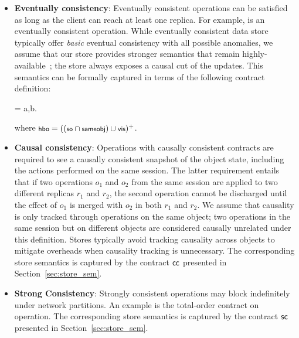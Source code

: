 \begin{itemize}
\setlength{\itemsep}{2pt}

\item \textbf{Eventually consistency}: Eventually consistent operations can be
satisfied as long as the client can reach at least one replica. For example,
 is an eventually consistent operation. While eventually consistent data
store typically offer \emph{basic} eventual consistency with all possible
anomalies, we assume that our store provides stronger semantics that remain
highly-available~\cite{BailisHAT,COPS}; the store always exposes a causal cut of
the updates. This semantics can be formally captured in terms of the
following contract definition:
\vspace{-1em}
\begin{smathpar}
\ecc = \forall a,b.  \wedge {} \Rightarrow {}
\end{smathpar}
\noindent where $\small \hboZ = ((\soZ \cap \sameobjZ) \cup \visZ)^+$.

\item \textbf{Causal consistency}: Operations with causally consistent
  contracts are required to see a causally consistent snapshot of the object
  state, including the actions performed on the same session.  The latter
  requirement entails that if two operations $o_1$ and $o_2$ from the same
  session are applied to two different replicas $r_1$ and $r_2$, the second
  operation cannot be discharged until the effect of $o_1$ is merged with
  $o_2$ in both $r_1$ and $r_2$.  We assume that causality is only tracked
  through operations on the same object; two operations in the same session
  but on different objects are considered causally unrelated under this
  definition. Stores typically avoid tracking causality across objects to
  mitigate overheads when causality tracking is unnecessary.  The corresponding
  store semantics is captured by the contract ${\sf cc}$ presented in
  Section~\ref{sec:store_sem}.

\item \textbf{Strong Consistency}: Strongly consistent operations may block
  indefinitely under network partitions. An example is the total-order
  contract on  operation. The corresponding store semantics is
  captured by the contract ${\sf sc}$ presented in Section~\ref{sec:store_sem}.

\end{itemize}


